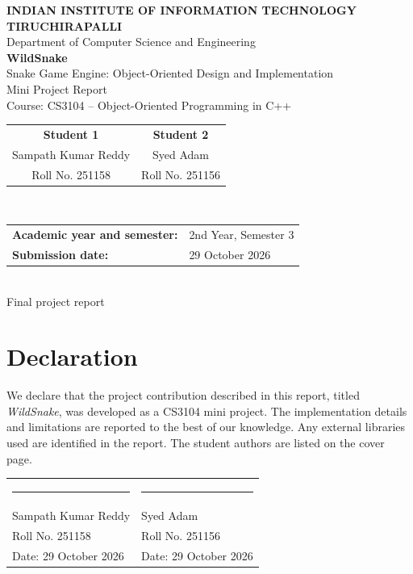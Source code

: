 \documentclass[12pt,a4paper]{report}
\begin{document}
\begin{titlepage}
  \centering
  {\Large \textbf{INDIAN INSTITUTE OF INFORMATION TECHNOLOGY TIRUCHIRAPALLI}}\\[3mm]
  {\large Department of Computer Science and Engineering}\\[18mm]
  {\Huge\bfseries WildSnake}\\[3mm]
  {\Large Snake Game Engine: Object-Oriented Design and Implementation}\\[18mm]
  {\large Mini Project Report}\\[2mm]
  {\large Course: CS3104 -- Object-Oriented Programming in C++}\\[16mm]
  \begin{tabular}{c@{\hspace{18mm}}c}
    \textbf{Student 1} & \textbf{Student 2}\\[3mm]
    \large Sampath Kumar Reddy & \large Syed Adam\\[2mm]
    Roll No. 251158 & Roll No. 251156
  \end{tabular}\\[12mm]
  \begin{tabular}{>{\bfseries}p{43mm}p{75mm}}
    Academic year and semester: & 2nd Year, Semester 3\\
    Submission date: & 29 October 2026
  \end{tabular}\\[20mm]
  \vfill
  {\large Final project report}
\end{titlepage}

\chapter*{Declaration}
We declare that the project contribution described in this report, titled
\textit{WildSnake}, was developed as a CS3104 mini project. The implementation
details and limitations are reported to the best of our knowledge. Any external
libraries used are identified in the report. The student authors are listed on
the cover page.

\vspace{15mm}
\begin{tabular}{p{70mm}p{70mm}}
  \rule{60mm}{0.4pt} & \rule{60mm}{0.4pt}\\
  Sampath Kumar Reddy & Syed Adam\\
  Roll No. 251158 & Roll No. 251156\\[3mm]
  Date: 29 October 2026 & Date: 29 October 2026
\end{tabular}
\end{document}
